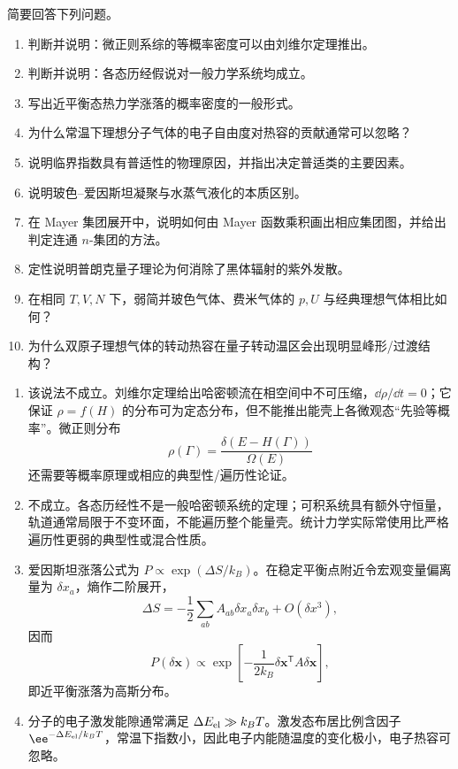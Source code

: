 
\begin{question}[40 分]
简要回答下列问题。
\begin{enumerate}
  \item 判断并说明：微正则系综的等概率密度可以由刘维尔定理推出。
  \item 判断并说明：各态历经假说对一般力学系统均成立。
  \item 写出近平衡态热力学涨落的概率密度的一般形式。
  \item 为什么常温下理想分子气体的电子自由度对热容的贡献通常可以忽略？
  \item 说明临界指数具有普适性的物理原因，并指出决定普适类的主要因素。
  \item 说明玻色--爱因斯坦凝聚与水蒸气液化的本质区别。
  \item 在 Mayer 集团展开中，说明如何由 Mayer 函数乘积画出相应集团图，并给出判定连通 $n$-集团的方法。
  \item 定性说明普朗克量子理论为何消除了黑体辐射的紫外发散。
  \item 在相同 $T,V,N$ 下，弱简并玻色气体、费米气体的 $p,U$ 与经典理想气体相比如何？
  \item 为什么双原子理想气体的转动热容在量子转动温区会出现明显峰形/过渡结构？
\end{enumerate}
\begin{solution}
\begin{enumerate}
  \item 该说法不成立。刘维尔定理给出哈密顿流在相空间中不可压缩，$\dd{\rho}/\dd{t}=0$；它保证 $\rho=f(H)$ 的分布可为定态分布，但不能推出能壳上各微观态“先验等概率”。微正则分布
  \[\rho(\Gamma)=\frac{\delta(E-H(\Gamma))}{\Omega(E)}\]
  还需要等概率原理或相应的典型性/遍历性论证。
  \item 不成立。各态历经性不是一般哈密顿系统的定理；可积系统具有额外守恒量，轨道通常局限于不变环面，不能遍历整个能量壳。统计力学实际常使用比严格遍历性更弱的典型性或混合性质。
  \item 爱因斯坦涨落公式为 $P\propto\exp(\Delta S/k_B)$。在稳定平衡点附近令宏观变量偏离量为 $\delta x_a$，熵作二阶展开，
  \[\Delta S=-\frac12\sum_{ab}A_{ab}\delta x_a\delta x_b+O(\delta x^3),\]
  因而
  \[P(\delta\bm x)\propto\exp\!\left[-\frac{1}{2k_B}\delta\bm x^{\mathsf T}A\delta\bm x\right],\]
  即近平衡涨落为高斯分布。
  \item 分子的电子激发能隙通常满足 $\Delta E_{\rm el}\gg k_BT$。激发态布居比例含因子 $\ee^{-\Delta E_{\rm el}/k_BT}$，常温下指数小，因此电子内能随温度的变化极小，电子热容可忽略。

\end{enumerate}
\end{solution}
\end{question}
